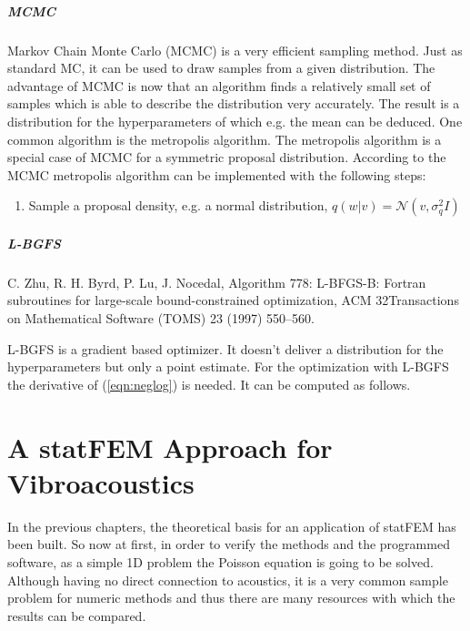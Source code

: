 \documentclass[%
  a4paper,oneside,%
  11pt,%
  smallchapters,
  style=printdev,
  extramargin,
  green,%
  rgb, <cmyk>
  ]{tubsbook}
\begin{document}
\paragraph{MCMC}
Markov Chain Monte Carlo (MCMC) is a very efficient sampling method. Just as standard MC, it can be used to draw samples from a given distribution. The advantage of MCMC is now that an algorithm finds a relatively small set of samples which is able to describe the distribution very accurately. The result is a distribution for the hyperparameters of which e.g. the mean can be deduced. One common algorithm is the metropolis algorithm.
The metropolis algorithm is a special case of MCMC for a symmetric proposal distribution.
According to \cite[p.31]{girolami2021} the MCMC metropolis algorithm can be implemented with the following steps:
\begin{enumerate}
\item Sample a proposal density, e.g. a normal distribution, $q(w|v) = \mathcal{N}(v,\sigma^2_q I)$
\end{enumerate}




\paragraph{L-BGFS}
C. Zhu, R. H. Byrd, P. Lu, J. Nocedal, Algorithm 778: L-BFGS-B: Fortran subroutines for large-scale bound-constrained optimization, ACM
32Transactions on Mathematical Software (TOMS) 23 (1997) 550–560.

L-BGFS is a gradient based optimizer. It doesn't deliver a distribution for the hyperparameters but only a point estimate.
For the optimization with L-BGFS the derivative of (\ref{eqn:neglog}) is needed. It can be computed as follows.






\chapter{A statFEM Approach for Vibroacoustics}
In the previous chapters, the theoretical basis for an application of statFEM has been built. So now at first, in order to verify the methods and the programmed software, as a simple 1D problem the Poisson equation is going to be solved. Although having no direct connection to acoustics, it is a very common sample problem for numeric methods and thus there are many resources \cite{girolami2021} \cite{langtangen2019} with which the results can be compared.
\end{document}
